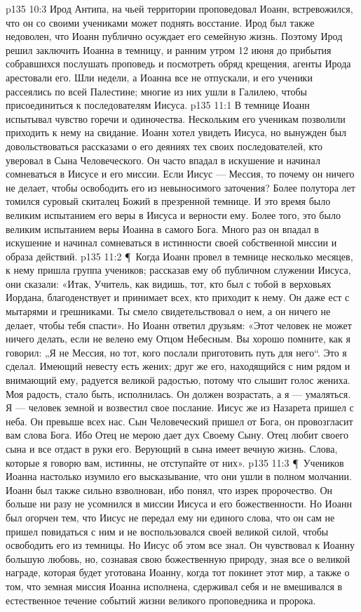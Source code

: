 \vs p135 10:3 Ирод Антипа, на чьей территории проповедовал Иоанн, встревожился, что он со своими учениками может поднять восстание. Ирод был также недоволен, что Иоанн публично осуждает его семейную жизнь. Поэтому Ирод решил заключить Иоанна в темницу, и ранним утром 12 июня до прибытия собравшихся послушать проповедь и посмотреть обряд крещения, агенты Ирода арестовали его. Шли недели, а Иоанна все не отпускали, и его ученики рассеялись по всей Палестине; многие из них ушли в Галилею, чтобы присоединиться к последователям Иисуса.
\vs p135 11:1 В темнице Иоанн испытывал чувство горечи и одиночества. Нескольким его ученикам позволили приходить к нему на свидание. Иоанн хотел увидеть Иисуса, но вынужден был довольствоваться рассказами о его деяниях тех своих последователей, кто уверовал в Сына Человеческого. Он часто впадал в искушение и начинал сомневаться в Иисусе и его миссии. Если Иисус --- Мессия, то почему он ничего не делает, чтобы освободить его из невыносимого заточения? Более полутора лет томился суровый скиталец Божий в презренной темнице. И это время было великим испытанием его веры в Иисуса и верности ему. Более того, это было великим испытанием веры Иоанна в самого Бога. Много раз он впадал в искушение и начинал сомневаться в истинности своей собственной миссии и образа действий.
\vs p135 11:2 \P\ Когда Иоанн провел в темнице несколько месяцев, к нему пришла группа учеников; рассказав ему об публичном служении Иисуса, они сказали: «Итак, Учитель, как видишь, тот, кто был с тобой в верховьях Иордана, благоденствует и принимает всех, кто приходит к нему. Он даже ест с мытарями и грешниками. Ты смело свидетельствовал о нем, а он ничего не делает, чтобы тебя спасти». Но Иоанн ответил друзьям: «Этот человек не может ничего делать, если не велено ему Отцом Небесным. Вы хорошо помните, как я говорил: „Я не Мессия, но тот, кого послали приготовить путь для него“. Это я сделал. Имеющий невесту есть жених; друг же его, находящийся с ним рядом и внимающий ему, радуется великой радостью, потому что слышит голос жениха. Моя радость, стало быть, исполнилась. Он должен возрастать, а я --- умаляться. Я --- человек земной и возвестил свое послание. Иисус же из Назарета пришел с неба. Он превыше всех нас. Сын Человеческий пришел от Бога, он провозгласит вам слова Бога. Ибо Отец не мерою дает дух Своему Сыну. Отец любит своего сына и все отдаст в руки его. Верующий в сына имеет вечную жизнь. Слова, которые я говорю вам, истинны, не отступайте от них».
\vs p135 11:3 \P\ Учеников Иоанна настолько изумило его высказывание, что они ушли в полном молчании. Иоанн был также сильно взволнован, ибо понял, что изрек пророчество. Он больше ни разу не усомнился в миссии Иисуса и его божественности. Но Иоанн был огорчен тем, что Иисус не передал ему ни единого слова, что он сам не пришел повидаться с ним и не воспользовался своей великой силой, чтобы освободить его из темницы. Но Иисус об этом все знал. Он чувствовал к Иоанну большую любовь, но, сознавая свою божественную природу, зная все о великой награде, которая будет уготована Иоанну, когда тот покинет этот мир, а также о том, что земная миссия Иоанна исполнена, сдерживал себя и не вмешивался в естественное течение событий жизни великого проповедника и пророка.
